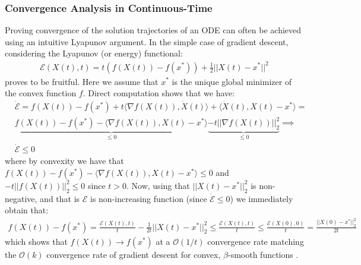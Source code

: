 \subsubsection{Convergence Analysis in Continuous-Time}
Proving convergence of the solution trajectories of an ODE can often be achieved using an intuitive Lyapunov argument. In the simple case of gradient descent, considering the Lyapunov (or energy) functional:
\begin{align*}
    \mathcal{E}(X(t), t) = t (f(X(t)) - f(x^*)) + \frac{1}{2}||X(t)-x^*||^2
\end{align*}
proves to be fruitful. Here we assume that $x^*$ is the unique global minimizer of the convex function $f$. Direct computation shows that we have:
\begin{align*}
    & \dot{\mathcal{E}}= f(X(t)) - f(x^*) + t \langle \nabla f(X(t)), \dot{X}(t) \rangle + \langle \dot{X}(t), X(t)-x^* \rangle = \\
    & \underbrace{f(X(t)) - f(x^*) - \langle \nabla f(X(t)), X(t) - x^* \rangle}_{\leq 0} \underbrace{- t || \nabla f(X(t))||_2^2}_{\leq 0} \implies \\
    & \dot{\mathcal{E}} \leq 0
\end{align*}
where by convexity we have that $f(X(t)) - f(x^*) - \langle \nabla f(X(t)), X(t) - x^* \rangle \leq 0$ and $ - t ||f(X(t))||_2^2 \leq 0$ since $t>0$. Now, using that $||X(t)-x^*||_2^2$ is non-negative, and that is $\mathcal{E}$ is non-increasing function (since $\dot{\mathcal{E}} \leq 0$) we immediately obtain that:
\begin{align*}
    f(X(t)) - f(x^*) = \frac{\mathcal{E}(X(t), t)}{t} - \frac{1}{2t} ||X(t) - x^*||_2^2 \leq \frac{\mathcal{E}(X(t), t)}{t} \leq \frac{\mathcal{E}(X(0), 0)}{t} = \frac{||X(0)-x^*||_2^2}{2t}
\end{align*}
which shows that $f(X(t)) \to f(x^*)$ at a $\mathcal{O}(1/t)$ convergence rate matching the $\mathcal{O}(k)$ convergence rate of gradient descent for convex, $\beta$-smooth functions \cite{DBLP:journals/ftml/Bubeck15}.


